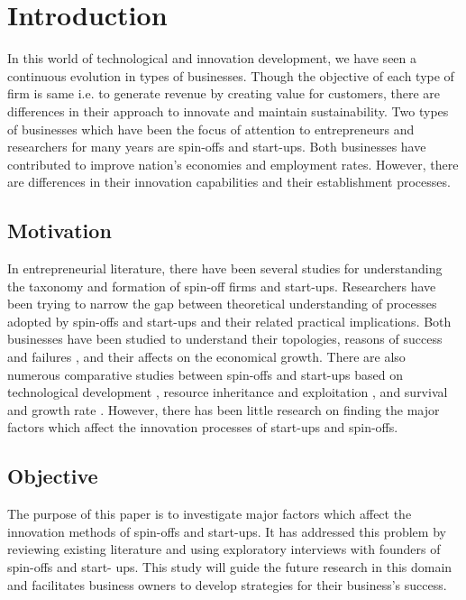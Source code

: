 \chapter{Introduction\label{cha:chapter1}}

In this world of technological and innovation development, we have seen a continuous
evolution in types of businesses. Though the objective of each type of firm is same i.e. to generate
revenue by creating value for customers, there are differences in their approach to innovate and
maintain sustainability. Two types of businesses which have been the focus of attention to
entrepreneurs and researchers for many years are spin-offs and start-ups. Both businesses have contributed to
improve nation’s economies and employment rates. However, there are differences in their
innovation capabilities and their establishment processes.


\section{Motivation\label{sec:moti}}
In entrepreneurial literature, there have been several studies for understanding the taxonomy and formation of spin-off firms and start-ups.
Researchers have been trying to narrow the gap between theoretical understanding of processes adopted by spin-offs and start-ups and their related practical implications. Both businesses have been studied to understand their topologies, reasons of success and failures \cite{fastcompany}, and their affects on
the economical growth\cite{economical_growth}. There are also numerous comparative studies between spin-offs and
start-ups based on technological development \cite{comparative_studies}, resource inheritance and exploitation \cite{resource_inheritance}, and
survival and growth rate \cite{whose_child}. However, there has been little research on finding the major factors which
affect the innovation processes of start-ups and spin-offs.

\section{Objective\label{sec:objective}}
The purpose of this paper is to investigate major factors which affect the innovation methods of
spin-offs and start-ups. It has addressed this problem by reviewing existing literature and using
exploratory interviews with founders of spin-offs and start-
ups. This study will guide the future research in this domain and facilitates business owners to
develop strategies for their business’s success.


